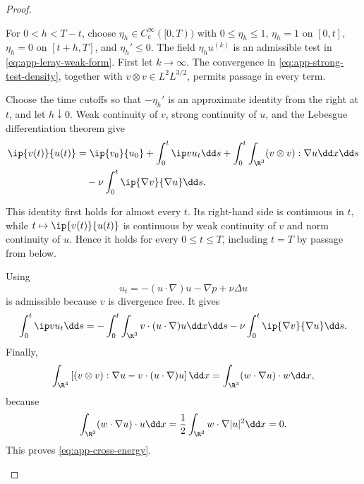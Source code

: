 \begin{proof}
\begin{samepage}
For \(0<h<T-t\), choose \(\eta_h\in C_c^\infty([0,T))\) with
\(0\le\eta_h\le1\), \(\eta_h=1\) on \([0,t]\),
\(\eta_h=0\) on \([t+h,T]\), and \(\eta_h'\le0\).  The field
\(\eta_hu^{(k)}\) is an admissible test in
\eqref{eq:app-leray-weak-form}.  First let \(k\to\infty\).
The convergence in \eqref{eq:app-strong-test-density}, together with
\(v\otimes v\in L^2L^{3/2}\), permits passage in every term.
\par
\end{samepage}
\begin{samepage}
Choose the time cutoffs so that \(-\eta_h'\) is an approximate identity from the right
at \(t\), and let \(h\downarrow0\).  Weak continuity of \(v\), strong
continuity of \(u\), and the Lebesgue differentiation theorem give
\begin{align*}
 \ip{v(t)}{u(t)}
 &=
 \ip{v_0}{u_0}
 +\int_0^t\ip v{u_t}\dd s
 +\int_0^t\int_{\R^3}(v\otimes v):\nabla u\dd x\dd s\\
 &\quad-\nu\int_0^t\ip{\nabla v}{\nabla u}\dd s.
\end{align*}
\par
\end{samepage}
This identity first holds for almost every \(t\).  Its right-hand side is
continuous in \(t\), while \(t\mapsto\ip{v(t)}{u(t)}\) is continuous by
weak continuity of \(v\) and norm continuity of \(u\).  Hence it holds for
every \(0\le t\le T\), including \(t=T\) by passage from below.
\begin{samepage}
Using
\[
 u_t=-(u\cdot\nabla)u-\nabla p+\nu\Delta u
\]
is admissible because \(v\) is divergence free.  It gives
\[
 \int_0^t\ip v{u_t}\dd s
 =
 -\int_0^t\int_{\R^3}v\cdot(u\cdot\nabla)u\dd x\dd s
 -\nu\int_0^t\ip{\nabla v}{\nabla u}\dd s.
\]
Finally,
\[
 \int_{\R^3}
 \left[(v\otimes v):\nabla u-v\cdot(u\cdot\nabla)u\right]\dd x
 =
 \int_{\R^3}(w\cdot\nabla u)\cdot w\dd x,
\]
because
\[
 \int_{\R^3}(w\cdot\nabla u)\cdot u\dd x
 =\frac12\int_{\R^3}w\cdot\nabla|u|^2\dd x=0.
\]
This proves \eqref{eq:app-cross-energy}.
\end{samepage}
\end{proof}

